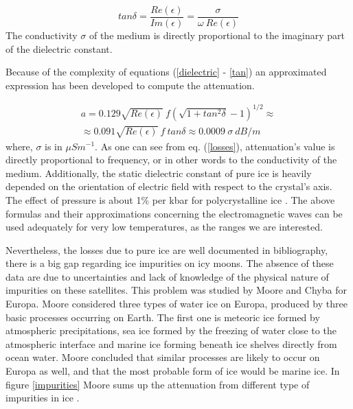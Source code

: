 {{\begin{equation}
    tan \delta=\frac{Re(\epsilon)}{Im(\epsilon)}=\frac{\sigma}{\omega\ Re(\epsilon)}
    \label{tan}
\end{equation}
The conductivity $\sigma$ of the medium is directly proportional to the imaginary part of the dielectric constant.

Because of the complexity of equations (\ref{dielectric} - \ref{tan}) an approximated expression has been developed to compute the attenuation.

\begin{multline}
    a=0.129 \sqrt{Re(\epsilon)}\ f (\sqrt{1+tan^2 \delta}-1)^{1/2} \approx \\
    \approx 0.091 \sqrt{Re(\epsilon)}\ f\ tan \delta \approx 0.0009\ \sigma\ dB/m
    \label{losses}
\end{multline}
where, $\sigma$ is in $\mu S m^{-1}$. As one can see from eq. (\ref{losses}), attenuation's value is directly proportional to frequency, or in other words to the conductivity of the medium. Additionally, the static dielectric constant of pure ice is heavily depended on the orientation of electric field with respect to the crystal's axis. The effect of pressure is about 1\% per kbar for polycrystalline ice \cite{Kofman_2010}. The above formulas and their approximations concerning the electromagnetic waves can be used adequately for very low temperatures, as the ranges we are interested.

Nevertheless, the losses due to pure ice are well documented in bibliography, there is a big gap regarding ice impurities on icy moons. The absence of these data are due to uncertainties and lack of knowledge of the physical nature of impurities on these satellites. This problem was studied by  Moore \cite{Moore_2000} and Chyba \cite{Chyba_1998} for Europa. Moore considered three types of water ice on Europa, produced by three basic processes occurring on Earth. The first one is meteoric ice formed by atmospheric precipitations, sea ice formed by the freezing of water close to the atmospheric interface and marine ice forming beneath ice shelves directly from ocean water. Moore concluded that similar processes are likely to occur on Europa as well, and that the most probable form of ice would be marine ice. In figure \ref{impurities} Moore sums up the attenuation from different type of impurities in ice \cite{Moore_2000}.

}}

